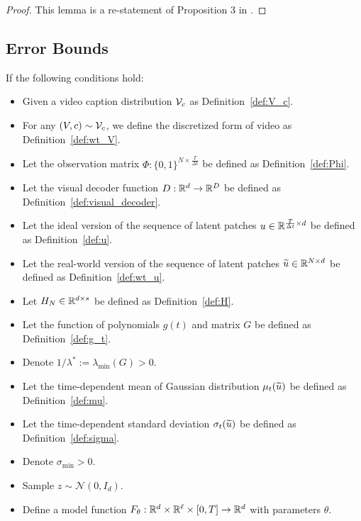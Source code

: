 \begin{proof}
    This lemma is a re-statement of Proposition 3 in \cite{gde+20}.
\end{proof}

\subsection{Error Bounds} \label{sub:app:error}

\begin{lemma}\label{lem:hippo_error}
    If the following conditions hold:
    \begin{itemize}
        \item Given a video caption distribution ${\cal V}_c$ as Definition~\ref{def:V_c}.
        \item For any $(V, c) \sim {\cal V}_c$, we define the discretized form of video as Definition~\ref{def:wt_V}.
        \item Let the observation matrix $\Phi: \{0, 1\}^{N \times \frac{T}{\Delta t}}$ be defined as Definition~\ref{def:Phi}.
        \item Let the visual decoder function $D: \mathbb{R}^d \rightarrow \mathbb{R}^D$ be defined as Definition~\ref{def:visual_decoder}.
        \item Let the ideal version of the sequence of latent patches $u \in \mathbb{R}^{\frac{T}{\Delta t} \times d}$ be defined as Definition~\ref{def:u}.
        \item Let the real-world version of the sequence of latent patches $\widetilde{u} \in \mathbb{R}^{N \times d}$ be defined as Definition~\ref{def:wt_u}.
        \item Let $H_N \in \mathbb{R}^{d \times s}$ be defined as Definition~\ref{def:H}.
        \item Let the function of polynomials $g(t)$ and matrix $G$ be defined as Definition~\ref{def:g_t}.
        \item Denote $1/\lambda^* := \lambda_{\min}(G) > 0$.
        \item Let the time-dependent mean of Gaussian distribution $\mu_t(\widetilde{u})$ be defined as Definition~\ref{def:mu}.
        \item Let the time-dependent standard deviation $\sigma_t(\widetilde{u})$ be defined as Definition~\ref{def:sigma}.
        \item Denote $\sigma_{\min} > 0$.
        \item Sample $z \sim \mathcal{N}(0, I_d)$.
        \item Define a model function $F_\theta: \mathbb{R}^d \times \mathbb{R}^\ell \times [0, T] \rightarrow \mathbb{R}^d$ with parameters $\theta$.

\end{itemize}
\end{lemma}
